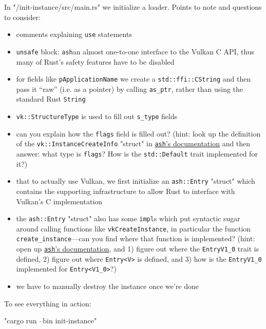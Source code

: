 \documentclass[12pt,letterpaper]{article}
\newcommand{\inquotes}[1]{``#1''}	%
\newcommand{\ril}[1]{\texttt{#1}}
\newcommand{\cil}[1]{\texttt{#1}}
\newcommand{\ash}{\texttt{ash}}
\begin{document}
In "/init-instance/src/main.rs" we initialize a loader. Points to note and questions to consider:
	\begin{itemize}
		\item comments explaining \ril{use} statements
		
		\item \ril{unsafe} block: \ash an almost one-to-one interface to the Vulkan C API, thus many of Rust's safety features have to be disabled
		
		\item for fields like \cil{pApplicationName} we create a \ril{std::ffi::CString} and then pass it \inquotes{raw} (i.e. as a pointer) by calling \ril{as_ptr}, rather than using the standard Rust \ril{String}
		
		\item \ril{vk::StructureType} is used to fill out \ril{s_type} fields
		
		\item can you explain how the \ril{flags} field is filled out? (hint: look up the definition of the \ril{vk::InstanceCreateInfo} "struct" in \href{https://docs.rs/ash}{\ash's documentation} and then answer: what type is \ril{flags}? How is the \ril{std::Default} trait implemented for it?)
		
		\item that to actually use Vulkan, we first initialize an \ril{ash::Entry} "struct" which contains the supporting infrastructure to allow Rust to interface with Vulkan's C implementation
		
		\item the \ril{ash::Entry} "struct" also has some \ril{impl}s which put syntactic sugar around calling functions like \ril{vkCreateInstance}, in particular the function \ril{create_instance}---can you find where that function is implemented? (hint: open up \href{https://docs.rs/ash}{\ash's documentation}, and 1) figure out where the \ril{EntryV1_0} trait is defined, 2) figure out where \ril{Entry<V>} is defined, and 3) how is the \ril{EntryV1_0} implemented for \ril{Entry<V1_0>}?)
		
		\item we have to manually destroy the instance once we're done
	\end{itemize} 
	
To see everything in action: 
	\begin{center}
		"cargo run --bin init-instance"
	\end{center}
	
\end{document}
